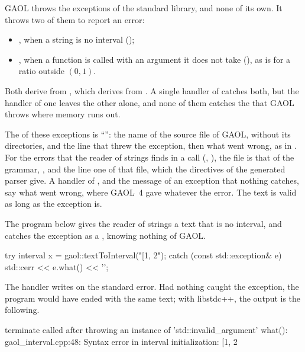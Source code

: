 \documentclass[12pt,a4paper,twoside,openright]{book}
\begin{document}
GAOL throws the exceptions of the standard library, and none of its
own.\newinvfive{} It throws two of them to report an error:
\begin{itemize}
\item {}, when a string is no interval
  ();
\item {}, when a function is called with an argument
  it does not take (), as  is for a
  ratio outside $(0, 1)$.
\end{itemize}

\noindent
Both derive from , which derives from
. A single handler of  catches
both, but the handler of one leaves the other alone, and none of them
catches the  that GAOL throws where memory runs out.

\medskip
The  of these exceptions is
``'': the name of the source file of GAOL,
without its directories, and the line that threw the exception, then what
went wrong, as in \code{gaol\_interval.cpp:48: Syntax error in interval
initialization: [1, 2}. For the errors that the reader of strings finds in a
call (, ), the file is that of the
grammar, , and the line one of that file,
which the directives  of the generated parser give. A handler
of , and the message of an exception that nothing
catches, say what went wrong, where GAOL~4 gave 
whatever the error. The text is valid as long as the exception is.

\begin{Ex}
The program below gives the reader of strings a text that is no interval,
and catches the exception as a , knowing nothing of
GAOL.
\begin{example}
try {
  interval x = gaol::textToInterval("[1, 2");
} catch (const std::exception& e) {
  std::cerr << e.what() << '\n';
}
\end{example}
The handler writes \code{gaol\_interval.cpp:48: Syntax error in interval
initialization: [1, 2} on the standard error. Had nothing caught the
exception, the program would have ended with the same text; with libstdc++,
the output is the following.
\begin{onscreen}
terminate called after throwing an instance of 'std::invalid_argument'
  what():  gaol_interval.cpp:48: Syntax error in interval initialization: [1, 2
\end{onscreen}
\end{Ex}
\end{document}

